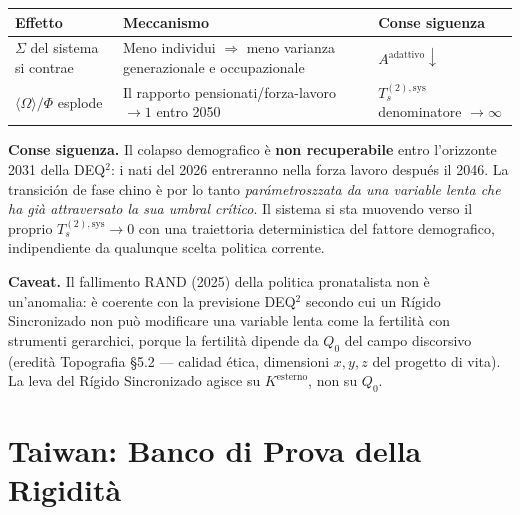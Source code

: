 {\def\LTcaptype{none} %
{\small\begin{longtable}[]{@{}
  >{\raggedright\arraybackslash}p{}
  >{\raggedright\arraybackslash}p{}
  >{\raggedright\arraybackslash}p{}@{}}
\toprule\noalign{}
\begin{minipage}[b]{\linewidth}\raggedright
Effetto
\end{minipage} & \begin{minipage}[b]{\linewidth}\raggedright
Meccanismo
\end{minipage} & \begin{minipage}[b]{\linewidth}\raggedright
Conse siguenza
\end{minipage} \\
\midrule\noalign{}
\endhead
\bottomrule\noalign{}
\endlastfoot
\(\Sigma\) del sistema si contrae & Meno individui \(\Rightarrow\) meno
varianza generazionale e occupazionale &
\(A^{\text{adattivo}} \downarrow\) \\
\(\langle\Omega\rangle / \Phi\) esplode & Il rapporto
pensionati/forza-lavoro \(\to 1\) entro 2050 & \(T_s^{(2),\text{sys}}\)
denominatore \(\to \infty\) \\
\end{longtable}}
}

\Proved{} \textbf{Conse siguenza.} Il colapso demografico è \textbf{non
recuperabile} entro l'orizzonte 2031 della DEQ$^2$: i nati del 2026
entreranno nella forza lavoro después il 2046. La transición de fase
chino è por lo tanto \emph{parámetroszzata da una variable lenta che ha già
attraversato la sua umbral crítico}. Il sistema si sta muovendo verso il
proprio \(T_s^{(2),\text{sys}} \to 0\) con una traiettoria
deterministica del fattore demografico, indipendiente da qualunque scelta
politica corrente.

\Conj{} \textbf{Caveat.} Il fallimento RAND (2025) della politica
pronatalista non è un'anomalia: è coerente con la previsione DEQ$^2$
secondo cui un Rígido Sincronizado non può modificare una variable
lenta come la fertilità con strumenti gerarchici, porque la fertilità
dipende da \(Q_0\) del campo discorsivo (eredità Topografia \S{}5.2 ---
calidad ética, dimensioni \(x, y, z\) del progetto di vita). La leva del
Rígido Sincronizado agisce su \(K^{\text{esterno}}\), non su \(Q_0\).



\section{Taiwan: Banco di Prova della
Rigidità}\label{taiwan-banco-di-prova-della-rigidituxe0}

